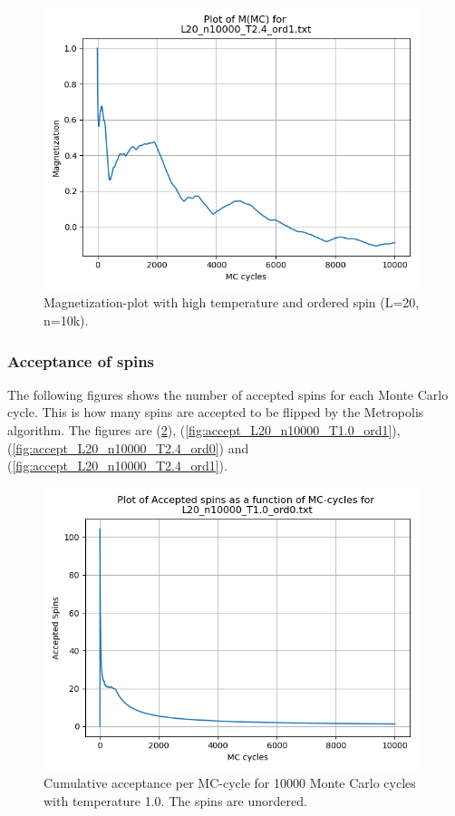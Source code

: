 \documentclass{article}
\begin{document}
    \begin{figure}[ht]
      \centering
      \includegraphics[width = 11cm]{img/magnet_L20_n10000_T24_ord1.png}
      \caption{Magnetization-plot with high temperature and ordered spin (L=20, n=10k).}
      \label{fig:L20-magnet-highT-ord1}
    \end{figure}


\subsubsection{Acceptance of spins} \label{sec:acceptance}

The following figures shows the number of accepted spins for each Monte Carlo cycle. This is how many spins are accepted to be flipped by the Metropolis algorithm. The figures are (\ref{fig:accept_L20_n10000_T1.0_ord0}), (\ref{fig:accept_L20_n10000_T1.0_ord1}), (\ref{fig:accept_L20_n10000_T2.4_ord0}) and (\ref{fig:accept_L20_n10000_T2.4_ord1}). \\

  \begin{figure}[ht]
      \centering
      \includegraphics[width = 11cm]{img/accept_L20_n10000_T10_ord0.png}
      \caption{Cumulative acceptance per MC-cycle for 10000 Monte Carlo cycles with temperature 1.0. The spins are unordered. }
      \label{fig:accept_L20_n10000_T1.0_ord0}
    \end{figure}
\end{document}
